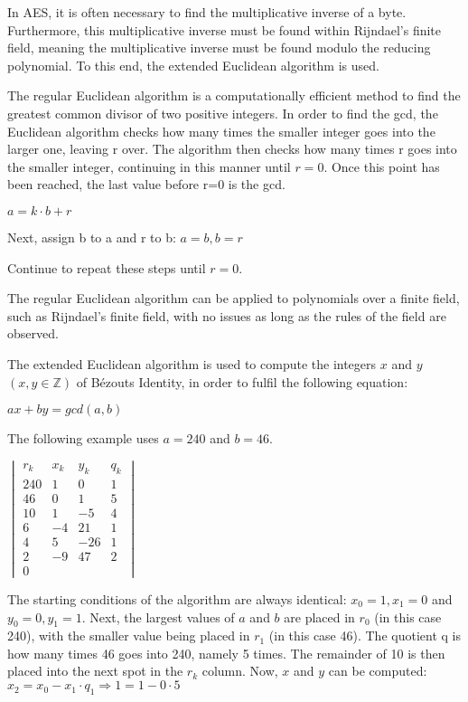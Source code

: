 \documentclass[12pt, a4paper]{report}
\theoremstyle{definition}
\theoremstyle{remark}
\begin{document}
In AES, it is often necessary to find the multiplicative inverse of a byte. Furthermore, this multiplicative inverse must be found within Rijndael's finite field, meaning the multiplicative inverse must be found modulo the reducing polynomial. To this end, the extended Euclidean algorithm is used.

The regular Euclidean algorithm is a computationally efficient method to find the greatest common divisor of two positive integers. In order to find the gcd, the Euclidean algorithm checks how many times the smaller integer goes into the larger one, leaving r over. The algorithm then checks how many times r goes into the smaller integer, continuing in this manner until $r=0$. Once this point has been reached, the last value before r=0 is the gcd\cite{stark1978introduction}.

$a = k \cdot b + r$

Next, assign b to a and r to b: $a=b, b=r$
 
Continue to repeat these steps until $r=0$.

The regular Euclidean algorithm can be applied to polynomials over a finite field, such as Rijndael's finite field, with no issues as long as the rules of the field are observed\cite{EuclideanPolynomials}.

The extended Euclidean algorithm is used to compute the integers $x$ and $y$ $({x,y} \in \mathbb{Z})$ of B\'ezouts Identity\cite{Bezout}, in order to fulfil the following equation:

$ax+by = gcd(a,b)$

The following example uses $a=240$ and $b=46$.

\begin{center}
$\begin{vmatrix}
r_k & x_k & y_k & q_k \\
240 & 1 & 0 & 1 \\
46 & 0 & 1 & 5 \\
10 & 1 & -5 & 4 \\
6 & -4 & 21 & 1 \\
4 & 5 & -26 & 1 \\
2 & -9 & 47 & 2 \\
0 &  &  &  \end{vmatrix}$
\end{center}

The starting conditions of the algorithm are always identical: $x_0=1, x_1=0$ and $y_0=0, y_1=1$. Next, the largest values of $a$ and $b$ are placed in $r_0$ (in this case 240), with the smaller value being placed in $r_1$ (in this case 46). The quotient q is how many times 46 goes into 240, namely 5 times. The remainder of 10 is then placed into the next spot in the $r_k$ column. Now, $x$ and $y$ can be computed:
$x_2=x_0-x_1 \cdot q_1 \Rightarrow 1=1-0 \cdot 5$
\end{document}
